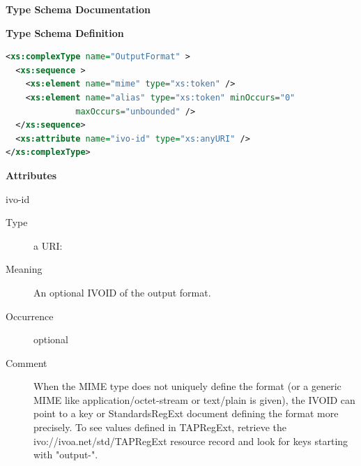 \documentclass{ivoa}
\begin{document}
\begingroup
      	\renewcommand*\descriptionlabel[1]{%
      	\hbox to 5.5em{\emph{#1}\hfil}}
      	\vspace{2ex}\noindent\textbf{ Type Schema Documentation}



\vspace{1ex}\noindent\textbf{ Type Schema Definition}

\begin{lstlisting}[language=XML,basicstyle=\footnotesize]
<xs:complexType name="OutputFormat" >
  <xs:sequence >
    <xs:element name="mime" type="xs:token" />
    <xs:element name="alias" type="xs:token" minOccurs="0"
              maxOccurs="unbounded" />
  </xs:sequence>
  <xs:attribute name="ivo-id" type="xs:anyURI" />
</xs:complexType>
\end{lstlisting}

\vspace{0.5ex}\noindent\textbf{ Attributes}

\begingroup\small\begin{bigdescription}
\item[ivo-id]
\begin{description}
\item[Type] a URI: 
\item[Meaning] 
        An optional IVOID of the output format.
        
\item[Occurrence] optional
\item[Comment] 
        	When the MIME type does not uniquely define the
        	format (or a generic MIME like application/octet-stream or
        	text/plain is given), the IVOID can point to a key
        	or StandardsRegExt document defining the format more
        	precisely.  To see values defined in TAPRegExt,
					retrieve the ivo://ivoa.net/std/TAPRegExt
      		resource record and look for keys starting with "output-".
        
\end{description}


\end{bigdescription}\endgroup
\end{document}

